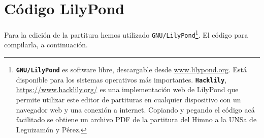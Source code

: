 \chapter{Código LilyPond}
\label{cap:codigo}

Para la edición de la partitura hemos utilizado \texttt{GNU/LilyPond}\footnote{\texttt{\textbf{GNU/LilyPond}} es software libre, descargable desde \url{www.lilypond.org}. Está disponible para los sistemas operativos más importantes. \texttt{\textbf{Hacklily}}, \url{https://www.hacklily.org/} es una implementación web de LilyPond que permite utilizar este editor de partituras en cualquier dispositivo con un navegador web y una conexión a internet. Copiando y pegando el código acá facilitado se obtiene un archivo PDF de la partitura del Himno a la UNSa de Leguizamón y Pérez.}. El código para compilarla, a continuación.

